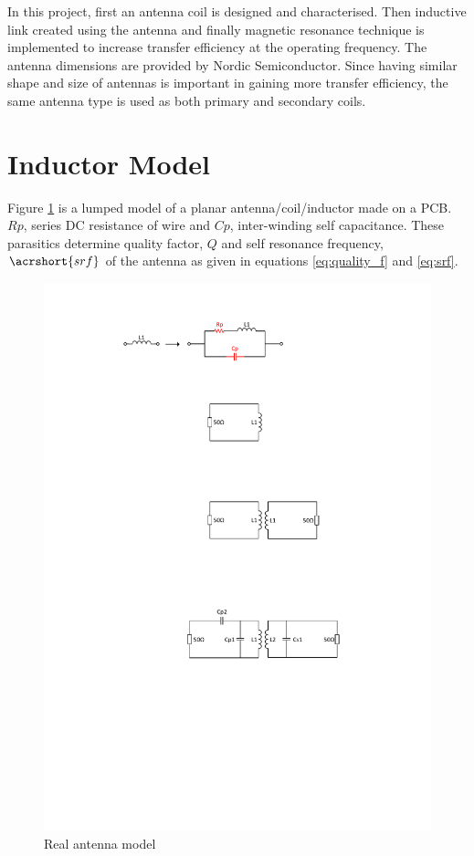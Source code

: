 \documentclass[UKenglish]{ifimaster}  %
\begin{document}
In this project, first an antenna coil is designed and characterised. Then inductive link created using the antenna
and finally magnetic resonance technique is implemented to increase transfer efficiency at the operating frequency. The antenna 
dimensions are provided by Nordic Semiconductor. Since having 
similar shape and size of antennas is important in gaining more transfer efficiency, the same antenna type is used as both 
primary and secondary coils. \\

\section{Inductor Model}		%

Figure \ref{fig:ant_non_ideal} is a lumped model of a planar antenna/coil/inductor made on a PCB. $Rp$, series DC resistance of wire and $Cp$, 
inter-winding self capacitance. These parasitics determine quality factor, $Q$ and self resonance frequency, $\acrshort{srf}$ of 
the antenna as given in equations  \ref{eq:quality_f} and  \ref{eq:srf}.  \\

\begin{figure}[!htbp] %
   \centering
   \includegraphics[width=1\textwidth]{img/ant_non_ideal.pdf} 
   \caption{Real antenna model}
   \label{fig:ant_non_ideal}
\end{figure}
\end{document}
